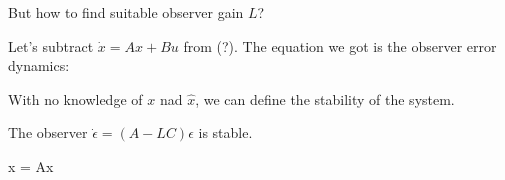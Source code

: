 But how to find suitable observer gain $L$?

Let's subtract $\dot x = Ax + Bu$ from (?). The equation we got is the observer error dynamics:





With no knowledge of $x$ nad $\hat x$, we can define the stability of the system. 

The observer $\dot \epsilon = (A - LC) \epsilon$ is stable. 

\dot x = Ax 